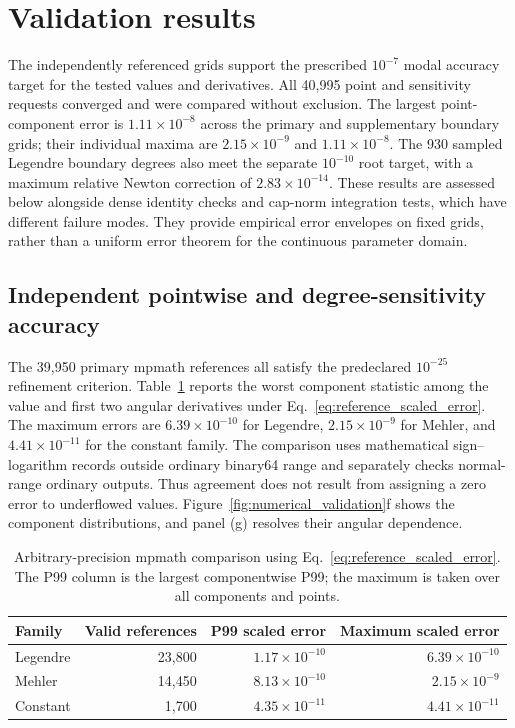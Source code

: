 ﻿\documentclass[11pt,a4paper]{article}
\begin{document}
\section{Validation results}
\label{sec:validation_results}

The independently referenced grids support the prescribed $10^{-7}$ modal accuracy target for the tested values and derivatives. All 40,995 point and sensitivity requests converged and were compared without exclusion. The largest point-component error is $1.11\times10^{-8}$ across the primary and supplementary boundary grids; their individual maxima are $2.15\times10^{-9}$ and $1.11\times10^{-8}$. The 930 sampled Legendre boundary degrees also meet the separate $10^{-10}$ root target, with a maximum relative Newton correction of $2.83\times10^{-14}$. These results are assessed below alongside dense identity checks and cap-norm integration tests, which have different failure modes. They provide empirical error envelopes on fixed grids, rather than a uniform error theorem for the continuous parameter domain.

\subsection{Independent pointwise and degree-sensitivity accuracy}

The 39,950 primary mpmath references all satisfy the predeclared $10^{-25}$ refinement criterion. Table~\ref{tab:mpmath_results} reports the worst component statistic among the value and first two angular derivatives under Eq.~\eqref{eq:reference_scaled_error}. The maximum errors are $6.39\times10^{-10}$ for Legendre, $2.15\times10^{-9}$ for Mehler, and $4.41\times10^{-11}$ for the constant family. The comparison uses mathematical sign--logarithm records outside ordinary binary64 range and separately checks normal-range ordinary outputs. Thus agreement does not result from assigning a zero error to underflowed values. Figure~\ref{fig:numerical_validation}f shows the component distributions, and panel (g) resolves their angular dependence.

\begin{table}[!htbp]
\centering
\small
\caption{Arbitrary-precision mpmath comparison using Eq.~\eqref{eq:reference_scaled_error}. The P99 column is the largest componentwise P99; the maximum is taken over all components and points.}
\label{tab:mpmath_results}
\begin{tabular}{lrrr}
\toprule
Family & Valid references & P99 scaled error & Maximum scaled error\\
\midrule
Legendre & 23,800 & $1.17\times10^{-10}$ & $6.39\times10^{-10}$\\
Mehler & 14,450 & $8.13\times10^{-10}$ & $2.15\times10^{-9}$\\
Constant & 1,700 & $4.35\times10^{-11}$ & $4.41\times10^{-11}$\\
\bottomrule
\end{tabular}
\end{table}
\end{document}

